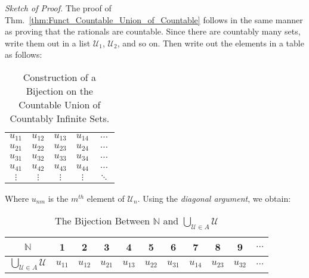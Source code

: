 \documentclass[crop=false,class=book,oneside]{standalone}
\begin{document}
            \textit{Sketch of Proof.} The proof of
            Thm.~\ref{thm:Funct_Countable_Union_of_Countable}
            follows in the same manner
            as proving that the rationals are countable. Since
            there are countably many sets, write them out in
            a list $\mathcal{U}_{1}$, $\mathcal{U}_{2}$, and
            so on. Then write out the elements in a table as
            follows:
            \begin{table}[H]
                \captionsetup{type=table}
                \centering
                \begin{tabular}{ccccc}
                    $u_{11}$&$u_{12}$&$u_{13}$
                    &$u_{14}$&$\hdots$\\
                    $u_{21}$&$u_{22}$&$u_{23}$
                    &$u_{24}$&$\hdots$\\
                    $u_{31}$&$u_{32}$&$u_{33}$
                    &$u_{34}$&$\hdots$\\
                    $u_{41}$&$u_{42}$&$u_{43}$
                    &$u_{44}$&$\hdots$\\
                    $\vdots$&$\vdots$&$\vdots$
                    &$\vdots$&$\ddots$
                \end{tabular}
                \caption{Construction of a Bijection on the
                         Countable Union of Countably Infinite
                         Sets.}
                \label{table:Func_Countable_Union_of_Countable}
            \end{table}
            Where $u_{nm}$ is the $m^{th}$ element of
            $\mathcal{U}_{n}$.
            Using the \textit{diagonal argument},
            we obtain:
            \begin{table}[H]
                \captionsetup{type=table}
                \centering
                \begin{tabular}{|c|c|c|c|c|c|c|c|c|c|c|}
                    \hline
                    $\mathbb{N}$&1&2&3&4&5&6&7&8&9&$\hdots$\\
                    \hline
                    $\bigcup_{\mathcal{U}\in{A}}\mathcal{U}$&
                    $u_{11}$&$u_{12}$&$u_{21}$&$u_{13}$&
                    $u_{22}$&$u_{31}$&$u_{14}$&$u_{23}$&
                    $u_{32}$&$\hdots$\\
                    \hline
                \end{tabular}
                \caption{The Bijection Between $\mathbb{N}$ and
                         $\bigcup_{\mathcal{U}\in{A}}\mathcal{U}$}
                \label{table:Func_Bijection_on_Countable_Union}
            \end{table}
\end{document}
